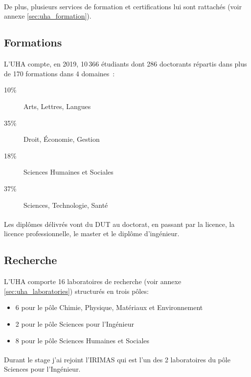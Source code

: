 \documentclass[a4paper,11pt,twoside,french,report]{../common/simplem}
\begin{document}
				\paragraph*{}
					De plus, plusieurs services de formation et certifications lui sont rattachés (voir annexe \ref{sec:uha_formation}).
			\subsection{Formations}
				\paragraph*{}
					L'\gls{UHA} compte, en 2019, 10\,366 étudiants dont 286 doctorants répartis dans plus de 170 formations dans 4 domaines~\cite{UHA_Chiffre_cles}:
					\begin{description}
						\item[10\%] Arts, Lettres, Langues
						\item[35\%] Droit, Économie, Gestion
						\item[18\%] Sciences Humaines et Sociales
						\item[37\%] Sciences, Technologie, Santé
					\end{description}
				\paragraph*{}
					Les diplômes délivrés vont du \gls{DUT} au doctorat, en passant par la licence, la licence professionnelle, le master et le diplôme d'ingénieur.
			\subsection{Recherche}
				\paragraph*{}
					L'\gls{UHA} comporte 16 laboratoires de recherche (voir annexe \ref{sec:uha_laboratories}) structurés en trois pôles:
					\begin{itemize}
						\item 6 pour le pôle Chimie, Physique, Matériaux et Environnement
						\item 2 pour le pôle Sciences pour l'Ingénieur
						\item 8 pour le pôle Sciences Humaines et Sociales
					\end{itemize}
				\paragraph*{}
					Durant le stage j'ai rejoint l'\gls{IRIMAS} qui est l'un des 2 laboratoires du pôle Sciences pour l'Ingénieur.
\end{document}
